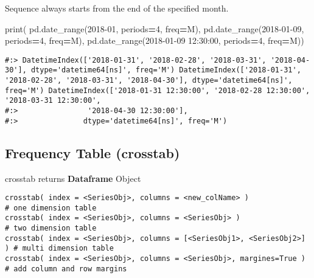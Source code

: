 \documentclass[
]{book}
\newenvironment{Shaded}{\begin{snugshade}}{\end{snugshade}}
\newcommand{\BuiltInTok}[1]{#1}
\newcommand{\DecValTok}[1]{\textcolor[rgb]{0.06,0.06,0.06}{#1}}
\newcommand{\NormalTok}[1]{#1}
\newcommand{\OperatorTok}[1]{\textcolor[rgb]{0.43,0.43,0.43}{\textbf{#1}}}
\newcommand{\StringTok}[1]{\textcolor[rgb]{0.5,0.5,0.5}{#1}}
\begin{document}
Sequence always starts from the end of the specified month.

\begin{Shaded}
\begin{Highlighting}[]
\BuiltInTok{print}\NormalTok{(}
\NormalTok{  pd.date\_range(}\StringTok{\textquotesingle{}2018{-}01\textquotesingle{}}\NormalTok{, periods}\OperatorTok{=}\DecValTok{4}\NormalTok{, freq}\OperatorTok{=}\StringTok{\textquotesingle{}M\textquotesingle{}}\NormalTok{),}
\NormalTok{  pd.date\_range(}\StringTok{\textquotesingle{}2018{-}01{-}09\textquotesingle{}}\NormalTok{, periods}\OperatorTok{=}\DecValTok{4}\NormalTok{, freq}\OperatorTok{=}\StringTok{\textquotesingle{}M\textquotesingle{}}\NormalTok{),}
\NormalTok{  pd.date\_range(}\StringTok{\textquotesingle{}2018{-}01{-}09 12:30:00\textquotesingle{}}\NormalTok{, periods}\OperatorTok{=}\DecValTok{4}\NormalTok{, freq}\OperatorTok{=}\StringTok{\textquotesingle{}M\textquotesingle{}}\NormalTok{))}
\end{Highlighting}
\end{Shaded}

\begin{verbatim}
#:> DatetimeIndex(['2018-01-31', '2018-02-28', '2018-03-31', '2018-04-30'], dtype='datetime64[ns]', freq='M') DatetimeIndex(['2018-01-31', '2018-02-28', '2018-03-31', '2018-04-30'], dtype='datetime64[ns]', freq='M') DatetimeIndex(['2018-01-31 12:30:00', '2018-02-28 12:30:00', '2018-03-31 12:30:00',
#:>                '2018-04-30 12:30:00'],
#:>               dtype='datetime64[ns]', freq='M')
\end{verbatim}

\hypertarget{frequency-table-crosstab}{%
\subsection{Frequency Table (crosstab)}\label{frequency-table-crosstab}}

crosstab returns \textbf{Dataframe} Object

\begin{verbatim}
crosstab( index = <SeriesObj>, columns = <new_colName> )                # one dimension table
crosstab( index = <SeriesObj>, columns = <SeriesObj> )                  # two dimension table
crosstab( index = <SeriesObj>, columns = [<SeriesObj1>, <SeriesObj2>] ) # multi dimension table   
crosstab( index = <SeriesObj>, columns = <SeriesObj>, margines=True )   # add column and row margins
\end{verbatim}
\end{document}
